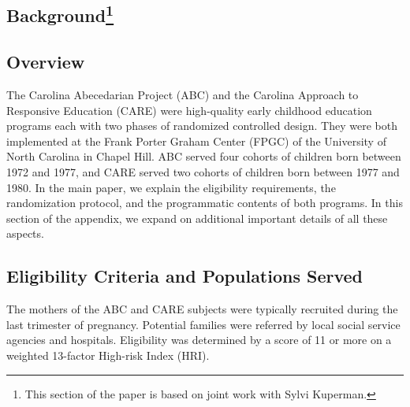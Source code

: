 \begin{appendices}
\setcounter{figure}{0}  \renewcommand{\thefigure}{A.\arabic{figure}}
\setcounter{table}{0}   \renewcommand{\thetable}{A.\arabic{table}}

\section[Background]{Background\footnote{This section of the paper is based on joint work with Sylvi Kuperman.}} \label{appendix:background}

\subsection{Overview}

\noindent The Carolina Abecedarian Project (ABC) and the Carolina Approach to Responsive Education (CARE) were high-quality early childhood education programs each with two phases of randomized controlled design. They were both implemented at the Frank Porter Graham Center (FPGC) of the University of North Carolina in Chapel Hill. ABC served four cohorts of children born between 1972 and 1977, and CARE served two cohorts of children born between 1977 and 1980. In the main paper, we explain the eligibility requirements, the randomization protocol, and the programmatic contents of both programs. In this section of the appendix, we expand on additional important details of all these aspects.

\subsection{Eligibility Criteria and Populations Served}

\noindent The mothers of the ABC and CARE subjects were typically recruited during the last trimester  of pregnancy. Potential families were referred by local social service agencies and hospitals. Eligibility was determined by a score of 11 or more on a weighted 13-factor High-risk Index (HRI).\\ 


\end{appendices}

